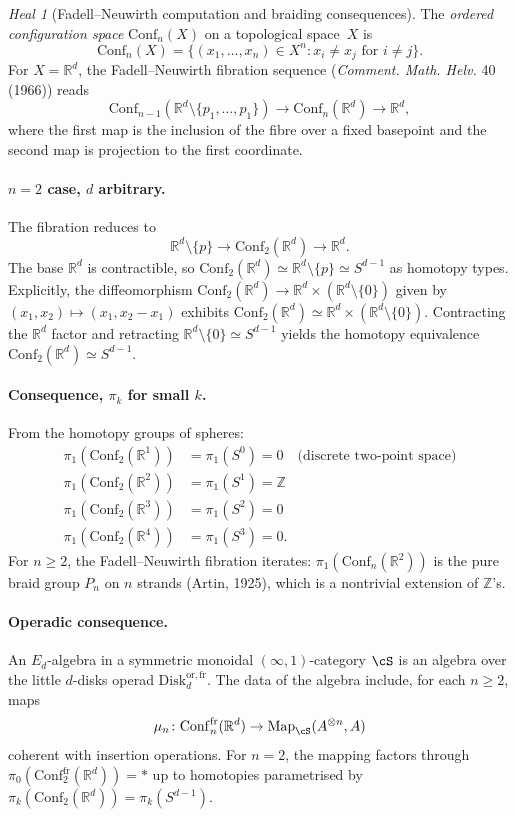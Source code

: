 \documentclass[11pt]{article}
\theoremstyle{definition}
\theoremstyle{remark}
\newtheorem{heal}[thm]{Heal}
\newcommand{\bR}{\mathbb{R}}
\newcommand{\bZ}{\mathbb{Z}}
\newcommand{\Conf}{\mathrm{Conf}}
\newcommand{\Disk}{\mathrm{Disk}}
\newcommand{\Map}{\mathrm{Map}}
\begin{document}
\begin{heal}[Fadell--Neuwirth computation and braiding consequences]
\label{heal:pi1-airtight}
The \emph{ordered configuration space} $\Conf_n(X)$ on a topological
space~$X$ is
\[
\Conf_n(X) = \{(x_1, \ldots, x_n) \in X^n : x_i \neq x_j \text{ for } i \neq j\}.
\]
For $X = \bR^d$, the Fadell--Neuwirth fibration sequence
(\textit{Comment. Math. Helv.} 40 (1966)) reads
\[
\Conf_{n-1}(\bR^d \setminus \{p_1, \ldots, p_1\}) \to
\Conf_n(\bR^d) \to
\bR^d,
\]
where the first map is the inclusion of the fibre over a fixed
basepoint and the second map is projection to the first coordinate.

\paragraph{$n = 2$ case, $d$ arbitrary.} The fibration reduces to
\[
\bR^d \setminus \{p\} \to \Conf_2(\bR^d) \to \bR^d.
\]
The base $\bR^d$ is contractible, so
$\Conf_2(\bR^d) \simeq \bR^d \setminus \{p\} \simeq S^{d-1}$
as homotopy types. Explicitly, the diffeomorphism
$\Conf_2(\bR^d) \to \bR^d \times (\bR^d \setminus \{0\})$
given by $(x_1, x_2) \mapsto (x_1, x_2 - x_1)$ exhibits
$\Conf_2(\bR^d) \simeq \bR^d \times (\bR^d \setminus \{0\})$.
Contracting the $\bR^d$ factor and retracting
$\bR^d \setminus \{0\} \simeq S^{d-1}$ yields the homotopy
equivalence $\Conf_2(\bR^d) \simeq S^{d-1}$.

\paragraph{Consequence, $\pi_k$ for small $k$.}
From the homotopy groups of spheres:
\begin{align*}
\pi_1(\Conf_2(\bR^1)) &= \pi_1(S^0) = 0 \quad\text{(discrete two-point space)} \\
\pi_1(\Conf_2(\bR^2)) &= \pi_1(S^1) = \bZ \\
\pi_1(\Conf_2(\bR^3)) &= \pi_1(S^2) = 0 \\
\pi_1(\Conf_2(\bR^4)) &= \pi_1(S^3) = 0.
\end{align*}
For $n \geq 2$, the Fadell--Neuwirth fibration iterates:
$\pi_1(\Conf_n(\bR^2))$ is the pure braid group $P_n$ on $n$
strands (Artin, 1925), which is a nontrivial extension of $\bZ$'s.

\paragraph{Operadic consequence.}
An $E_d$-algebra in a symmetric monoidal $(\infty,1)$-category
$\cS$ is an algebra over the little $d$-disks operad
$\Disk_d^{\mathrm{or,fr}}$. The data of the algebra include, for
each $n \geq 2$, maps
\[
\mu_n\colon \Conf_n^{\mathrm{fr}}(\bR^d) \to \Map_{\cS}(A^{\otimes n}, A)
\]
coherent with insertion operations. For $n = 2$, the mapping
factors through $\pi_0(\Conf_2^{\mathrm{fr}}(\bR^d)) = *$ up to
homotopies parametrised by $\pi_k(\Conf_2(\bR^d)) = \pi_k(S^{d-1})$.


\end{heal}
\end{document}
